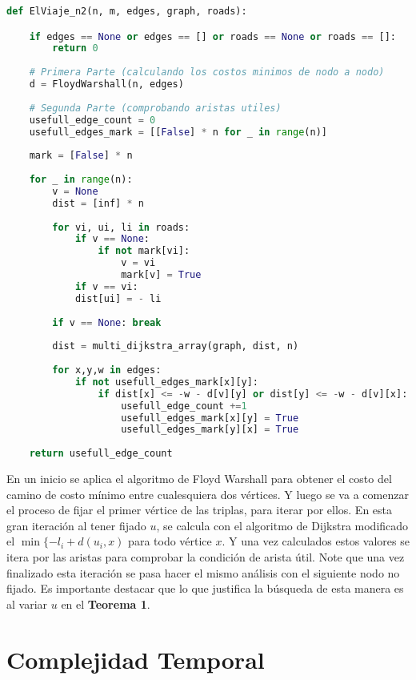 \documentclass[a4paper]{article}
\begin{document}
	\begin{lstlisting}[language=Python]
def ElViaje_n2(n, m, edges, graph, roads):

    if edges == None or edges == [] or roads == None or roads == []:
        return 0
    
    # Primera Parte (calculando los costos minimos de nodo a nodo)
    d = FloydWarshall(n, edges)
    
    # Segunda Parte (comprobando aristas utiles)
    usefull_edge_count = 0
    usefull_edges_mark = [[False] * n for _ in range(n)]
    
    mark = [False] * n
    
    for _ in range(n):
        v = None
        dist = [inf] * n
        
        for vi, ui, li in roads:
            if v == None:
                if not mark[vi]:
                    v = vi
                    mark[v] = True
            if v == vi:
            dist[ui] = - li
        
        if v == None: break
        
        dist = multi_dijkstra_array(graph, dist, n)
        
        for x,y,w in edges:
            if not usefull_edges_mark[x][y]:
                if dist[x] <= -w - d[v][y] or dist[y] <= -w - d[v][x]:
                    usefull_edge_count +=1
                    usefull_edges_mark[x][y] = True
                    usefull_edges_mark[y][x] = True
    
    return usefull_edge_count
	\end{lstlisting}

	En un inicio se aplica el algoritmo de Floyd Warshall para obtener el costo del camino de costo mínimo entre cualesquiera dos vértices. Y luego se va a comenzar el proceso de fijar el primer vértice de las triplas, para iterar por ellos. En esta gran iteración al tener fijado $u$, se calcula con el algoritmo de Dijkstra modificado el $\min\{-l_i + d(u_i,x)$ para todo vértice $x$. Y una vez calculados estos valores se itera por las aristas para comprobar la condición de arista útil. Note que una vez finalizado esta iteración se pasa hacer el mismo análisis con el siguiente nodo no fijado. Es importante destacar que lo que justifica la búsqueda de esta manera es al variar $u$ en el \textbf{Teorema 1}.
	
	\section*{Complejidad Temporal}
	
\end{document}
